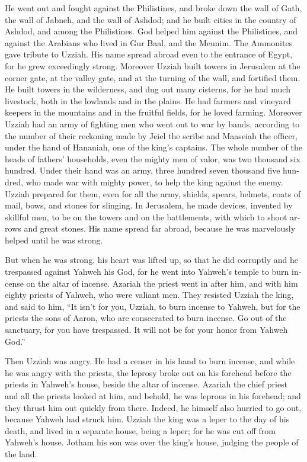 \begin{paracol}{2}
\begin{otherlanguage}{english}
 He went out and fought against the Philistines, and broke
down the wall of Gath, the wall of Jabneh, and the wall of Ashdod; and
he built cities in the country of Ashdod, and among the Philistines.
 God helped him against the Philistines, and against the
Arabians who lived in Gur Baal, and the Meunim.  The
Ammonites gave tribute to Uzziah. His name spread abroad even to the
entrance of Egypt, for he grew exceedingly strong. 
Moreover Uzziah built towers in Jerusalem at the corner gate, at the
valley gate, and at the turning of the wall, and fortified them.
 He built towers in the wilderness, and dug out many
cisterns, for he had much livestock, both in the lowlands and in the
plains. He had farmers and vineyard keepers in the mountains and in the
fruitful fields, for he loved farming.  Moreover Uzziah
had an army of fighting men who went out to war by bands, according to
the number of their reckoning made by Jeiel the scribe and Maaseiah the
officer, under the hand of Hananiah, one of the king's captains.
 The whole number of the heads of fathers' households,
even the mighty men of valor, was two thousand six hundred.
 Under their hand was an army, three hundred seven
thousand five hundred, who made war with mighty power, to help the king
against the enemy.  Uzziah prepared for them, even for
all the army, shields, spears, helmets, coats of mail, bows, and stones
for slinging.  In Jerusalem, he made devices, invented by
skillful men, to be on the towers and on the battlements, with which to
shoot arrows and great stones. His name spread far abroad, because he
was marvelously helped until he was strong.

 But when he was strong, his heart was lifted up, so that
he did corruptly and he trespassed against Yahweh his God, for he went
into Yahweh's temple to burn incense on the altar of incense.
 Azariah the priest went in after him, and with him
eighty priests of Yahweh, who were valiant men.  They
resisted Uzziah the king, and said to him, ``It isn't for you, Uzziah,
to burn incense to Yahweh, but for the priests the sons of Aaron, who
are consecrated to burn incense. Go out of the sanctuary, for you have
trespassed. It will not be for your honor from Yahweh God.''

 Then Uzziah was angry. He had a censer in his hand to
burn incense, and while he was angry with the priests, the leprosy broke
out on his forehead before the priests in Yahweh's house, beside the
altar of incense.  Azariah the chief priest and all the
priests looked at him, and behold, he was leprous in his forehead; and
they thrust him out quickly from there. Indeed, he himself also hurried
to go out, because Yahweh had struck him.  Uzziah the
king was a leper to the day of his death, and lived in a separate house,
being a leper; for he was cut off from Yahweh's house. Jotham his son
was over the king's house, judging the people of the land.


\end{otherlanguage}
\end{paracol}
